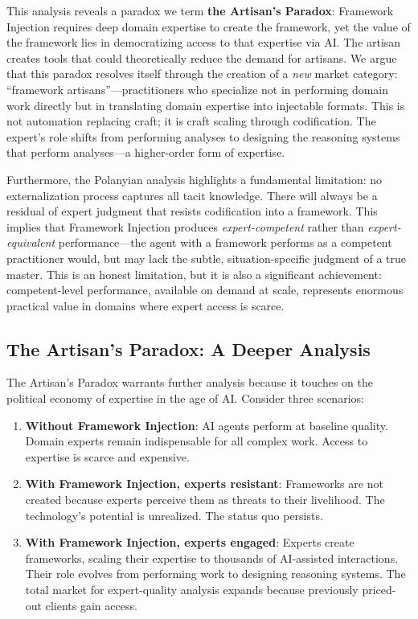 \documentclass[12pt,a4paper]{article}
\begin{document}
This analysis reveals a paradox we term \textbf{the Artisan's Paradox}: Framework Injection requires deep domain expertise to create the framework, yet the value of the framework lies in democratizing access to that expertise via AI. The artisan creates tools that could theoretically reduce the demand for artisans. We argue that this paradox resolves itself through the creation of a \emph{new} market category: ``framework artisans''---practitioners who specialize not in performing domain work directly but in translating domain expertise into injectable formats. This is not automation replacing craft; it is craft scaling through codification. The expert's role shifts from performing analyses to designing the reasoning systems that perform analyses---a higher-order form of expertise.

Furthermore, the Polanyian analysis highlights a fundamental limitation: no externalization process captures all tacit knowledge. There will always be a residual of expert judgment that resists codification into a framework. This implies that Framework Injection produces \emph{expert-competent} rather than \emph{expert-equivalent} performance---the agent with a framework performs as a competent practitioner would, but may lack the subtle, situation-specific judgment of a true master. This is an honest limitation, but it is also a significant achievement: competent-level performance, available on demand at scale, represents enormous practical value in domains where expert access is scarce.

\subsection{The Artisan's Paradox: A Deeper Analysis}
\label{sec:theory:paradox}

The Artisan's Paradox warrants further analysis because it touches on the political economy of expertise in the age of AI. Consider three scenarios:

\begin{enumerate}
    \item \textbf{Without Framework Injection}: AI agents perform at baseline quality. Domain experts remain indispensable for all complex work. Access to expertise is scarce and expensive.

    \item \textbf{With Framework Injection, experts resistant}: Frameworks are not created because experts perceive them as threats to their livelihood. The technology's potential is unrealized. The status quo persists.

    \item \textbf{With Framework Injection, experts engaged}: Experts create frameworks, scaling their expertise to thousands of AI-assisted interactions. Their role evolves from performing work to designing reasoning systems. The total market for expert-quality analysis expands because previously priced-out clients gain access.
\end{enumerate}
\end{document}
